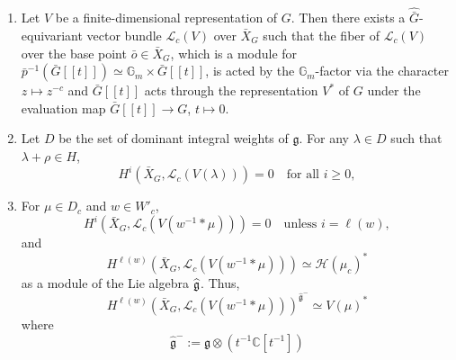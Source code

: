 \documentclass[12pt]{article}
\begin{document}
\begin{lemma}
    \leavevmode
\begin{enumerate}
\item[(a)]
Let $V$ be a finite-dimensional representation of $G$. Then there exists a $\widehat{\bar G}$-equivariant vector bundle $\mathcal L_c(V)$ over $\bar X_G$ such that the fiber of $\mathcal L_c(V)$ over the base point $\bar o\in \bar X_G$, which is a module for $\bar p^{-1}(\bar G[[t]])\simeq \mathbb G_m\times \bar G[[t]]$, is acted by the $\mathbb G_m$-factor via the character $z\mapsto z^{-c}$ and $\bar G[[t]]$ acts through the representation $V^*$ of $G$ under the evaluation map $\bar G[[t]]\to G$, $t\mapsto 0$.
\item[(b)] Let $D$ be the set of dominant integral weights of $\mathfrak g$. For any $\lambda\in D$ such that $\lambda+\rho\in H$, 
\[
H^i(\bar X_G,\mathcal L_c(V(\lambda)))=0
\quad\text{for all } i\ge 0,
\]
\item[(c)]
For $\mu\in D_c$ and $w\in W'_c$, 
\[
H^i(\bar X_G,\mathcal L_c(V(w^{-1}*\mu)))=0
\quad\text{unless } i=\ell(w),
\]
and
\[
H^{\ell(w)}(\bar X_G,\mathcal L_c(V(w^{-1}*\mu)))
\simeq \mathcal H(\mu_c)^*
\]
as a module of the Lie algebra $\widehat{\mathfrak{g}}$. Thus,
\[
H^{\ell(w)}(\bar X_G,\mathcal L_c(V(w^{-1}*\mu)))^{\hat{\mathfrak g}^-}
\simeq V(\mu)^*
\]
where
\[
\hat{\mathfrak g}^- := \mathfrak g \otimes (t^{-1}\mathbb C[t^{-1}])
\]
\end{enumerate}
\end{lemma}
\end{document}
